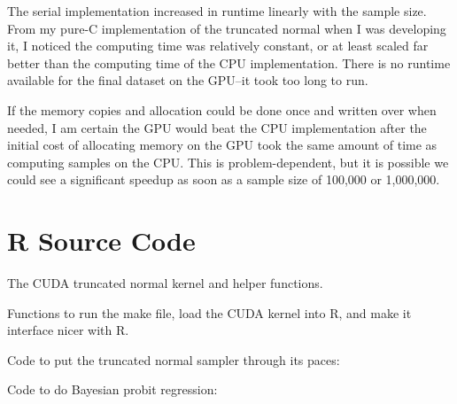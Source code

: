 \documentclass[12pt]{article}
\begin{document}
The serial implementation increased in runtime linearly with the sample size. From my pure-C implementation of the truncated normal when I was developing it, I noticed the computing time was relatively constant, or at least scaled far better than the computing time of the CPU implementation. There is no runtime available for the final dataset on the GPU--it took too long to run.

If the memory copies and allocation could be done once and written over when needed, I am certain the GPU would beat the CPU implementation after the initial cost of allocating memory on the GPU took the same amount of time as computing samples on the CPU. This is problem-dependent, but it is possible we could see a significant speedup as soon as a sample size of 100,000 or 1,000,000.

\newpage
\section*{R Source Code}
The CUDA truncated normal kernel and helper functions.


\newpage

Functions to run the make file, load the CUDA kernel into R, and make it interface nicer with R.


Code to put the truncated normal sampler through its paces:


Code to do Bayesian probit regression:

\end{document}
